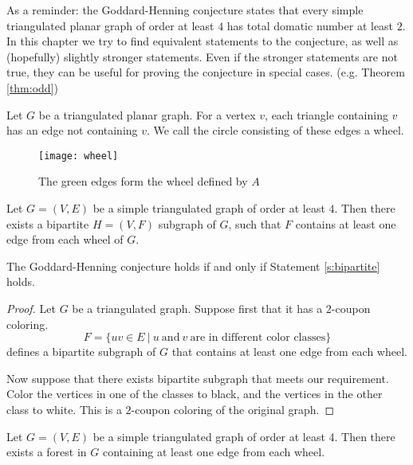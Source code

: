 As a reminder: the Goddard-Henning conjecture states that every simple triangulated
planar graph of order at least $4$ has total domatic number at least $2$. In this
chapter we try to find equivalent statements to the
conjecture, as well as (hopefully) slightly stronger statements. Even if the stronger
statements are not true, they can be useful for proving the conjecture in special cases.
(e.g. Theorem \ref{thm:odd})

\begin{definition}
  Let $G$ be a triangulated planar graph. For a vertex $v$, each triangle
  containing $v$ has an edge not containing $v$. We call the circle consisting of
  these edges a wheel.
\end{definition}

\begin{figure}[ht]
  \centering
  \texttt{[image: wheel]}
  \caption{The green edges form the wheel defined by $A$ }
  \label{fig:wheel}
\end{figure}

\begin{guess}\label{s:bipartite}
  Let $G = (V, E)$ be a simple triangulated graph of order at least $4$. Then there
  exists a bipartite $H = (V, F)$ subgraph of $G$, such that $F$ contains at
  least one edge from each wheel of $G$.
\end{guess}

\begin{claim}
  The Goddard-Henning conjecture holds if and only if Statement \ref{s:bipartite} holds.
\end{claim}
\begin{proof}
  Let $G$ be a triangulated graph. Suppose first that it has a $2$-coupon coloring.
  $$F = \{uv \in E\ |\ u\ \textrm{and}\ v\ \textrm{are in different color classes}\}$$
  defines a bipartite subgraph of $G$ that contains at least one edge from each wheel.

  Now suppose that there exists bipartite subgraph that meets our requirement. Color
  the vertices in one of the classes to black, and the vertices in the other class
  to white. This is a $2$-coupon coloring of the original graph.
\end{proof}

\begin{guess}\label{s:forest}
  Let $G = (V, E)$ be a simple triangulated graph of order at least $4$. Then there
  exists a forest in $G$ containing at least one edge from each wheel.
\end{guess}


